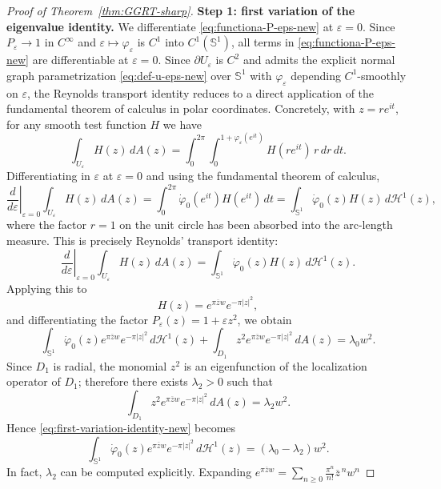 \documentclass[a4paper,11pt,reqno]{amsart}
\numberwithin{equation}{section}
\theoremstyle{plain} %
\theoremstyle{definition} %
\theoremstyle{remark}
\begin{document}
\begin{proof}[Proof of Theorem~\ref{thm:GGRT-sharp}]
\medskip
\noindent
{\bf Step 1: first variation of the eigenvalue identity.} We differentiate \eqref{eq:functiona-P-eps-new} at $\varepsilon=0$.
Since \(P_\varepsilon\to 1\) in \(C^\infty\) and
\(\varepsilon\mapsto \varphi_\varepsilon\) is \(C^1\) into \(C^1(\mathbb S^1)\),
all terms in \eqref{eq:functiona-P-eps-new} are differentiable at
\(\varepsilon=0\). Since $\partial U_\varepsilon$ is $C^2$ and admits the
explicit normal graph parametrization \eqref{eq:def-u-eps-new} over
$\mathbb S^1$ with $\varphi_\varepsilon$ depending $C^1$-smoothly on
$\varepsilon$, the Reynolds transport identity reduces to a direct application
of the fundamental theorem of calculus in polar coordinates. Concretely, with
\(z=re^{it}\), for any smooth test function \(H\) we have
\[
\int_{U_\varepsilon} H(z)\,dA(z)
=
\int_0^{2\pi}\int_0^{1+\varphi_\varepsilon(e^{it})}
H(re^{it})\,r\,dr\,dt.
\]
Differentiating in \(\varepsilon\) at \(\varepsilon=0\) and using the
fundamental theorem of calculus,
\[
\left.\frac{d}{d\varepsilon}\right|_{\varepsilon=0}
\int_{U_\varepsilon} H(z)\,dA(z)
=
\int_0^{2\pi}\dot\varphi_0(e^{it})H(e^{it})\,dt
=
\int_{\mathbb S^1}\dot\varphi_0(z)H(z)\,d\mathcal H^1(z),
\]
where the factor \(r=1\) on the unit circle has been absorbed into the
arc-length measure. This is precisely Reynolds' transport identity:
\[
\left.\frac{d}{d\varepsilon}\right|_{\varepsilon=0}
\int_{U_\varepsilon} H(z)\,dA(z)
=
\int_{\mathbb S^1} \dot\varphi_0(z)H(z)\,d\mathcal H^1(z).
\]
Applying this to
\[
H(z)=e^{\pi \overline zw}e^{-\pi|z|^2},
\]
and differentiating the factor $P_\varepsilon(z)=1+\varepsilon z^2$, we obtain
\begin{equation}\label{eq:first-variation-identity-new}
\int_{\mathbb S^1}
\dot\varphi_0(z)e^{\pi \overline zw}e^{-\pi|z|^2}\,d\mathcal H^1(z)
+
\int_{D_1} z^2 e^{\pi \overline zw}e^{-\pi|z|^2}\,dA(z)
=
\lambda_0 w^2.
\end{equation}
Since $D_1$ is radial, the monomial $z^2$ is an eigenfunction of the
localization operator of $D_1$; therefore there exists $\lambda_2>0$ such that
\[
\int_{D_1} z^2 e^{\pi \overline zw}e^{-\pi|z|^2}\,dA(z)=\lambda_2 w^2.
\]
Hence \eqref{eq:first-variation-identity-new} becomes
\begin{equation}\label{eq:boundary-identity-new}
\int_{\mathbb S^1}
\dot\varphi_0(z)e^{\pi \overline zw}e^{-\pi|z|^2}\,d\mathcal H^1(z)
=
(\lambda_0-\lambda_2)w^2.
\end{equation}
In fact, \(\lambda_2\) can be computed explicitly. Expanding
\(e^{\pi \overline zw}=\sum_{n\geq 0}\frac{\pi^n}{n!}\overline z^{\,n}w^n\)

\end{proof}
\end{document}
